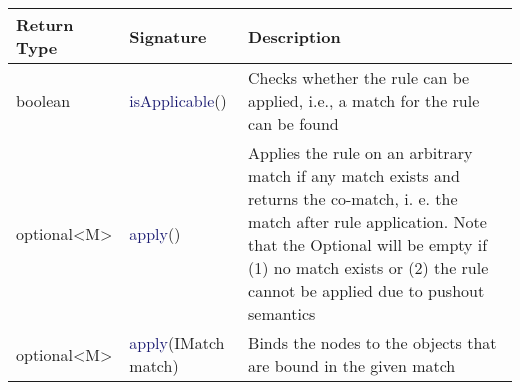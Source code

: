 {

\begin{center}
\begin{tabular}{ | m{4.25cm} | m{4.25cm} | m{4.5cm} | }
\hline
\textbf{Return Type} & \textbf{Signature} & \textbf{Description} \\
\hline
\textsf{boolean} & \textcolor{MidnightBlue}{isApplicable}() & Checks whether the rule can be applied, i.e., a match for the rule can be found \\
\hline
\textsf{optional<M>} & \textcolor{MidnightBlue}{apply}() & Applies the rule on an arbitrary match if any match exists and returns the co-match, i. e. the match after rule application. Note that the Optional will be empty if (1) no match exists or (2) the rule cannot be applied due to pushout semantics \\
\hline
\textsf{optional<M>} & \textcolor{MidnightBlue}{apply}(IMatch match) & Binds the nodes to the objects that are bound in the given match \\
\hline


\end{tabular}
\end{center}}
